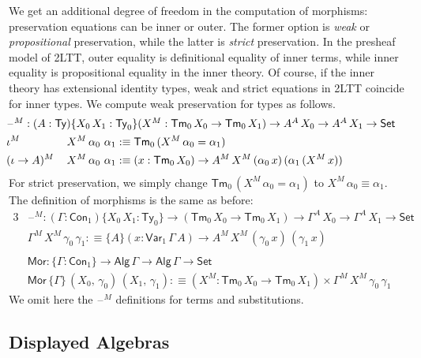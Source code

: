 \documentclass[12pt,a4paper,twoside,openany]{book}
\theoremstyle{remark}
\theoremstyle{definition}
\theoremstyle{theorem}
\newcommand{\ms}[1]{\mathsf{#1}}
\newcommand{\Con}{\mathsf{Con}}
\newcommand{\Tm}{\mathsf{Tm}}
\newcommand{\Ty}{\mathsf{Ty}}
\newcommand{\blank}{\mathord{\hspace{1pt}\text{--}\hspace{1pt}}}
\newcommand{\Set}{\mathsf{Set}}
\newcommand{\Var}{\ms{Var}}
\newcommand{\Alg}{\ms{Alg}}
\newcommand{\Mor}{\ms{Mor}}
\newcommand{\defn}{:\equiv}
\begin{document}
We get an additional degree of freedom in the computation of morphisms:
preservation equations can be inner or outer. The former option is \emph{weak}
or \emph{propositional} preservation, while the latter is \emph{strict}
preservation. In the presheaf model of 2LTT, outer equality is definitional
equality of inner terms, while inner equality is propositional equality in the
inner theory. Of course, if the inner theory has extensional identity types,
weak and strict equations in 2LTT coincide for inner types. We compute weak
preservation for types as follows.
\begin{alignat*}{3}
  & \hspace{-5em}\rlap{$\blank^M : (A : \Ty)\{X_0\,X_1 : \Ty_0\}(X^M : \Tm_0\,X_0 \to \Tm_0\,X_1) \to A^A\,X_0 \to A^A\,X_1 \to \Set$}\\
  & \hspace{-5em}\iota^M\,&&X^M\,\alpha_0\,\,\alpha_1 \defn \Tm_0\,(X^M\,\alpha_0 = \alpha_1) \\
  & \hspace{-5em}(\iota\to A)^M\,&&X^M\,\alpha_0\,\,\alpha_1 \defn
       (x : \Tm_0\,X_0) \to A^M\,X^M\,(\alpha_0\,x)\,(\alpha_1\,(X^M\,x))
\end{alignat*}
For strict preservation, we simply change $\Tm_0\,(X^M\,\alpha_0 = \alpha_1)$ to
$X^M\,\alpha_0 \equiv \alpha_1$. The definition of morphisms is the same as
before:
\begin{alignat*}{3}
  &\blank^M : (\Gamma : \Con_1)\{X_0\,X_1 : \Ty_0\} \to (\Tm_0\,X_0 \to \Tm_0\,X_1) \to \Gamma^A\,X_0 \to \Gamma^A\,X_1 \to \Set\\
  &\Gamma^M\,X^M\,\gamma_0\,\gamma_1 \defn
  \{A\}(x : \Var_1\,\Gamma\,A) \to A^M\,X^M\,(\gamma_0\,x)\,(\gamma_1\,x)\\
  & \\
  &\Mor : \{\Gamma : \Con_1\} \to \Alg\,\Gamma \to \Alg\,\Gamma \to \Set \\
  &\Mor\,\{\Gamma\}\,(X_0,\,\gamma_0)\,(X_1,\,\gamma_1) \defn (X^M : \Tm_0\,X_0 \to \Tm_0\,X_1) \times \Gamma^M\,X^M\,\gamma_0\,\gamma_1
\end{alignat*}
We omit here the $\blank^M$ definitions for terms and substitutions.

\subsection{Displayed Algebras}
\end{document}
